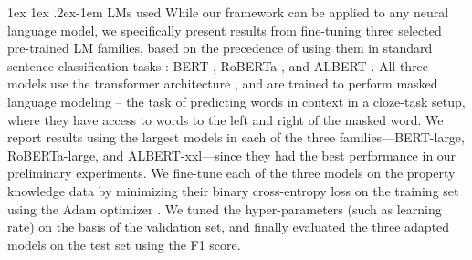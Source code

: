 \documentclass[10pt,letterpaper]{article}
\makeatletter
\newcommand{\km}[1]{\textcolor{purple}{$_{KM}$[#1]}}
\newcommand{\concepts}{\mathcal{C}}
\newcommand{\properties}{\mathcal{P}}
\renewcommand{\paragraph}{%
  \@startsection{paragraph}{4}%
  {\z@}{1ex \@plus 1ex \@minus .2ex}{-1em}%
  {\normalfont\normalsize\bfseries}%
}
\makeatother
\begin{document}
\paragraph{LMs used}
While our framework can be applied to any neural language model, we specifically present results from fine-tuning three selected pre-trained LM families, based on the precedence of using them in standard sentence classification tasks \citep{wang2018glue}: BERT \citep{devlin-etal-2019-bert}, RoBERTa \citep{liu2019roberta}, and ALBERT \citep{lan2019albert}. 
All three models use the transformer architecture \citep{vaswani2017attention}, and are trained to perform masked language modeling -- the task of predicting words in context in a cloze-task setup, where they have access to words to the left and right of the masked word. 
We report results using the largest models in each of the three families---BERT-large, RoBERTa-large, and ALBERT-xxl---since they had the best performance in our preliminary experiments.
We fine-tune each of the three models on the property knowledge data by minimizing their binary cross-entropy loss on the training set using the Adam optimizer \citep{kingma2014adam}.
We tuned the hyper-parameters (such as learning rate) on the basis of the validation set, and finally evaluated the three adapted models on the test set using the F1 score.

\end{document}
